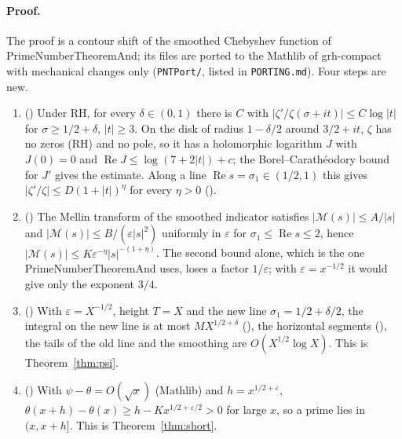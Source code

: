 \documentclass[11pt]{article}
\theoremstyle{definition}
\theoremstyle{remark}
\begin{document}
\paragraph{Proof.} The proof is a contour shift of the smoothed Chebyshev function of
PrimeNumberTheoremAnd; its files are ported to the Mathlib of grh-compact with mechanical changes
only (\texttt{PNTPort/}, listed in \texttt{PORTING.md}). Four steps are new.
\begin{enumerate}
\item () Under RH, for every $\delta\in(0,1)$ there is
$C$ with $|\zeta'/\zeta(\sigma+it)|\le C\log|t|$ for $\sigma\ge1/2+\delta$, $|t|\ge3$. On the disk of
radius $1-\delta/2$ around $3/2+it$, $\zeta$ has no zeros (RH) and no pole, so it has a holomorphic
logarithm $J$ with $J(0)=0$ and $\operatorname{Re}J\le\log(7+2|t|)+c$; the Borel--Carathéodory bound
for $J'$ gives the estimate. Along a line $\operatorname{Re}s=\sigma_1\in(1/2,1)$ this gives
$|\zeta'/\zeta|\le D(1+|t|)^{\eta}$ for every $\eta>0$
().
\item () The Mellin transform of the smoothed indicator
satisfies $|\mathcal M(s)|\le A/|s|$ and $|\mathcal M(s)|\le B/(\varepsilon|s|^2)$ uniformly in
$\varepsilon$ for $\sigma_1\le\operatorname{Re}s\le2$, hence
$|\mathcal M(s)|\le K\varepsilon^{-\eta}|s|^{-(1+\eta)}$. The second bound alone, which is the one
PrimeNumberTheoremAnd uses, loses a factor $1/\varepsilon$; with $\varepsilon=x^{-1/2}$ it would
give only the exponent $3/4$.
\item () With $\varepsilon=X^{-1/2}$, height $T=X$ and the new
line $\sigma_1=1/2+\delta/2$, the integral on the new line is at most $M X^{1/2+\delta}$
(), the horizontal segments (), the tails of
the old line and the smoothing are $O(X^{1/2}\log X)$. This is Theorem~\ref{thm:psi}.
\item () With $\psi-\theta=O(\sqrt x)$
(Mathlib) and $h=x^{1/2+\varepsilon}$, $\theta(x+h)-\theta(x)\ge h-Kx^{1/2+\varepsilon/2}>0$ for
large $x$, so a prime lies in $(x,x+h]$. This is Theorem~\ref{thm:short}.
\end{enumerate}
\end{document}
